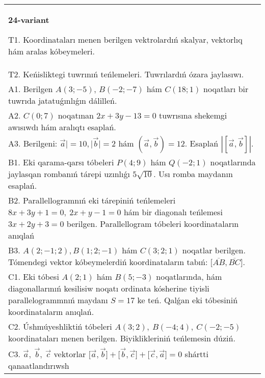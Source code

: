 \documentclass{article}
\begin{document}
\begin{tabular}{m{17cm}}
\textbf{24-variant}
\newline

T1. 
Koordinataları menen berilgen vektrolardıń skalyar, vektorlıq hám aralas kóbeymeleri. \\
T2. 
Keńisliktegi tuwrınıń teńlemeleri. Tuwrılardıń ózara jaylasıwı.
 \\
A1. 
Berilgen $A(3; -5)$, $B(-2; -7)$ hám
$C(18; 1)$ noqatları bir tuwrıda jatatuǵınlıǵın dálilleń.
 \\
A2. 
$C(0;7)$ noqatınan $2x+3y-13=0$ tuwrısına 
shekemgi awısıwdı hám aralıqtı esaplań.
 \\
A3. 
Berilgeni: $\overrightarrow{a}| = 10,|\overrightarrow{b}| = 2$ hám
$\left(\overrightarrow{a},\overrightarrow{b} \right) = 12$. Esaplań
$\left| \left\lbrack \overrightarrow{a},\overrightarrow{b} \right\rbrack \right|$.
 \\
B1. Eki qarama-qarsı tóbeleri \(P(4;9)\) hám \(Q(-2; 1)\) noqatlarında jaylasqan rombanıń tárepi uzınlıǵı \(5\sqrt{10}\). Usı
romba maydanın esaplań.
 \\
B2. 
Parallellogramnıń eki tárepiniń teńlemeleri
\(8x+3y+1=0,\ 2x+y-1=0\) hám bir diagonalı teńlemesi
\(3x+2y+3=0\) berilgen. Parallellogram tóbeleri koordinataların
anıqlań
 \\
B3. 
$A (2; -1;2),B (1;2; - 1) $ hám $C (3;2;1) $ noqatlar berilgen. Tómendegi vektor kóbeymelerdiń koordinataların tabıń: 
$\lbrack\overline{AB},\overline{BC}\rbrack$.
 \\
C1. 
Eki tóbesi \(A(2;1)\) hám \(B(5; - 3)\) noqatlarında, hám
diagonallarınıń kesilisiw noqatı ordinata kósherine tiyisli
parallelogrammnıń maydanı \(S = 17\) ke teń. Qalǵan eki tóbesiniń
koordinataların anıqlań. \\
C2. 
Úshmúyeshliktiń tóbeleri
\(A(3;2),\ B( - 4;4),\ C( - 2; - 5)\) koordinataları menen berilgen.
Biyiklikleriniń teńlemesin dúziń.
 \\
C3. 
\(\vec{a},\ \vec{b},\ \vec{c}\) vektorlar \(\lbrack\vec{a},\vec{b}\rbrack + \lbrack\vec{b},\vec{c}\rbrack + \lbrack\vec{c},\vec{a}\rbrack = 0\) shártti qanaatlandırıwsh
 \\

\end{tabular}
\vspace{1cm}
\end{document}
